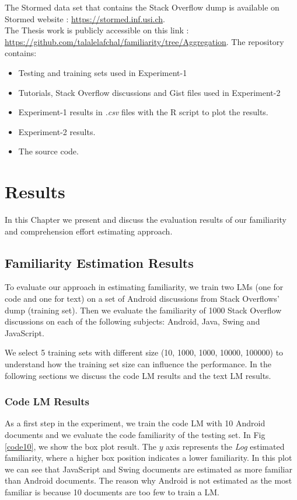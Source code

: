 \documentclass[12pt,mscthesis]{usiinfthesis}
\begin{document}
{ 	The Stormed data set that contains the Stack Overflow dump is available on Stormed website : \url{https://stormed.inf.usi.ch}.\\


 	The Thesis work is publicly accessible on this link : \url{https://github.com/talalelafchal/familiarity/tree/Aggregation}. The repository contains:
 	\begin{itemize}
 	\item Testing and training sets used in Experiment-1
 	\item Tutorials, Stack Overflow discussions and Gist files used in Experiment-2
 	\item Experiment-1 results in \emph{.csv} files with the R script to plot the results.
 	\item Experiment-2 results.
 	\item The source code.
 	\end{itemize} 


\chapter{Results}
	In this Chapter we present and discuss the evaluation results of our familiarity and comprehension effort estimating approach.

\section{Familiarity Estimation Results}

To evaluate our approach in estimating familiarity, we train two LMs (one for code and one for text) on a set of Android discussions from Stack Overflows' dump (training set). Then we evaluate the familiarity of 1000 Stack Overflow discussions on each of the following subjects: Android, Java, Swing and JavaScript.

We select 5 training sets with different size (10, 1000, 1000, 10000, 100000) to understand how the training set size can influence the performance. In the following sections we discuss the code LM results and the text LM results.

\subsection{Code LM Results}
  As a first step in the experiment, we train the code LM with 10 Android documents and we evaluate the code familiarity of the testing set. In Fig \ref{code10}, we show the box plot result. The $y$ axis represents the \emph{Log} estimated familiarity, where a higher box position indicates a lower familiarity. In this plot we can see that JavaScript and Swing documents are estimated as more familiar than Android documents. The reason why Android is not estimated as the most familiar is because 10 documents are too few to train a LM. 



}
\end{document}
